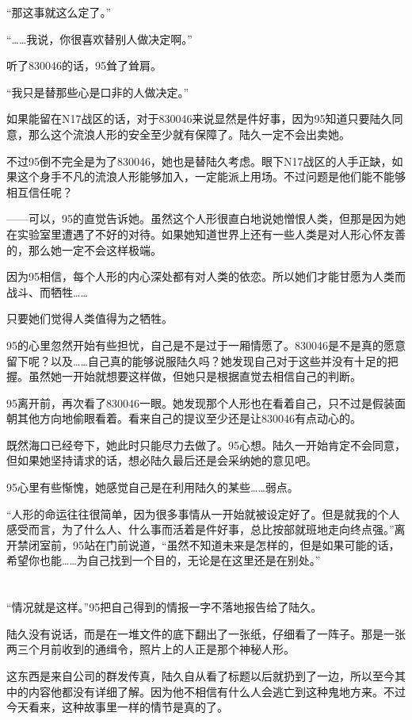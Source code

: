 “那这事就这么定了。”

“……我说，你很喜欢替别人做决定啊。”

听了830046的话，95耸了耸肩。

“我只是替那些心是口非的人做决定。”

如果能留在N17战区的话，对于830046来说显然是件好事，因为95知道只要陆久同意，那么这个流浪人形的安全至少就有保障了。陆久一定不会出卖她。

不过95倒不完全是为了830046，她也是替陆久考虑。眼下N17战区的人手正缺，如果这个身手不凡的流浪人形能够加入，一定能派上用场。不过问题是他们能不能够相互信任呢？

——可以，95的直觉告诉她。虽然这个人形很直白地说她憎恨人类，但那是因为她在实验室里遭遇了不好的对待。如果她知道世界上还有一些人类是对人形心怀友善的，那么她一定不会这样极端。

因为95相信，每个人形的内心深处都有对人类的依恋。所以她们才能甘愿为人类而战斗、而牺牲……

只要她们觉得人类值得为之牺牲。

95的心里忽然开始有些担忧，自己是不是过于一厢情愿了。830046是不是真的愿意留下呢？以及……自己真的能够说服陆久吗？她发现自己对于这些并没有十足的把握。虽然她一开始就想要这样做，但她只是根据直觉去相信自己的判断。

95离开前，再次看了830046一眼。她发现那个人形也在看着自己，只不过是假装面朝其他方向地偷眼看着。看来自己的提议至少还是让830046有点动心的。

既然海口已经夸下，她此时只能尽力去做了。95心想。陆久一开始肯定不会同意，但如果她坚持请求的话，想必陆久最后还是会采纳她的意见吧。

95心里有些惭愧，她感觉自己是在利用陆久的某些……弱点。

“人形的命运往往很简单，因为很多事情从一开始就被设定好了。但是就我的个人感受而言，为了什么人、什么事而活着是件好事，总比按部就班地走向终点强。”离开禁闭室前，95站在门前说道，“虽然不知道未来是怎样的，但是如果可能的话，希望你也能……为自己找到一个目的，无论是在这里还是在别处。”

\section*{}

“情况就是这样。”95把自己得到的情报一字不落地报告给了陆久。

陆久没有说话，而是在一堆文件的底下翻出了一张纸，仔细看了一阵子。那是一张两三个月前收到的通缉令，照片上的人正是那个神秘人形。

这东西是来自公司的群发传真，陆久自从看了标题以后就扔到了一边，所以至今其中的内容他都没有详细了解。因为他不相信有什么人会逃亡到这种鬼地方来。不过今天看来，这种故事里一样的情节是真的了。

